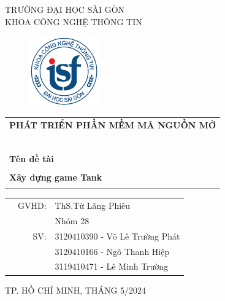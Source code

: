 \documentclass[a4paper]{article}
\begin{document}
\begin{titlepage}
\begin{center}
TRƯỜNG ĐẠI HỌC SÀI GÒN \\
KHOA CÔNG NGHỆ THÔNG TIN
\end{center}
\vspace{1cm}

\begin{figure}[h!]
\begin{center}
\includegraphics[width=3cm]{logoITSGU.png}
\end{center}
\end{figure}

\vspace{1cm}


\begin{center}
\begin{tabular}{c}
	\multicolumn{1}{l}{\textbf{{\Large PHÁT TRIỂN PHẦN MỀM MÃ NGUỒN MỞ}}}\\
	~~\\
	\hline
	\\
	\multicolumn{1}{l}{\textbf{{\Large Tên đề tài}}}\\
	\\
	
	\multicolumn{1}{l}{\textbf{{\Large Xây dựng game Tank}}}\\
	\\
	\hline
\end{tabular}
\end{center}

\vspace{3cm}

\begin{table}[h]
\begin{tabular}{rrl}
\hspace{5 cm} & GVHD: &ThS.Từ Lãng Phiêu\\
& & Nhóm 28\\
& SV: &  3120410390 - Võ Lê Trường Phát  \\
& & 3120410166 - Ngô Thanh Hiệp \\
& & 3119410471 - Lê Minh Trường \\
\end{tabular}
\vspace{1.5 cm}
\end{table}

\begin{center}

{\footnotesize TP. HỒ CHÍ MINH, THÁNG 5/2024}
\end{center}
\end{titlepage}
\end{document}
